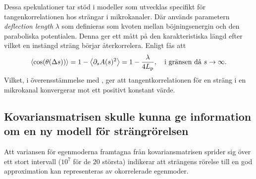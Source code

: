 Dessa spekulationer tar stöd i modeller som utvecklas specifikt för tangenkorrelationen hos strängar i mikrokanaler. Där används parametern \emph{deflection length} $\lambda$ som definieras som kvoten mellan böjningsenergin och den paraboliska potentialen. Denna ger ett mått på den karakteristiska längd efter vilket en instängd sträng börjar återkorrelera. Enligt \cite{Koster_etal2007} fås att
\begin{equation}
\ev{\cos(\theta(\Delta s))}=1-\ev{\partial_{s}A(s)^2}=1-\frac{\lambda}{4L_\text{p}}
\qcomma \text{i gränsen då } s\to\infty.
\end{equation}
Vilket, i överensstämmelse med , ger att tangentkorrelationen för en sträng i en mikrokanal konvergerar mot ett positivt konstant värde. %





\subsection{Kovariansmatrisen skulle kunna ge information om en ny modell för strängrörelsen}
Att variansen för egenmoderna framtagna från kovariansmatrisen sprider sig över ett stort intervall ($10^7$ för de $20$ största) indikerar att strängens rörelse till en god approximation kan representeras av okorrelerade egenmoder. 

